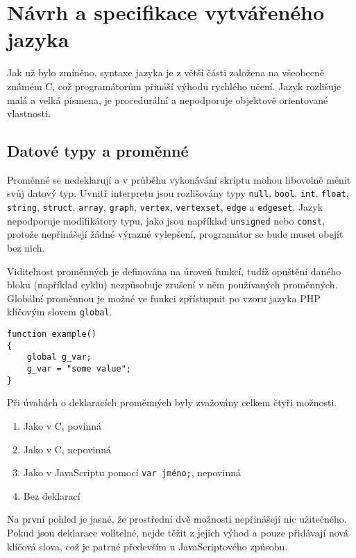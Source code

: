 \documentclass[11pt,twoside,a4paper]{book}
\begin{document}
\section{Návrh a specifikace vytvářeného jazyka}

Jak už bylo zmíněno, syntaxe jazyka je z větší části založena na všeobecně známém C, což programátorům přináší výhodu rychlého učení. Jazyk rozlišuje malá a velká písmena, je procedurální a nepodporuje objektově orientované vlastnosti.


\subsection{Datové typy a proměnné}
\label{datove_typy_a_promenne}

Proměnné se nedeklarují a v průběhu vykonávání skriptu mohou libovolně měnit svůj datový typ. Uvnitř interpretu jsou rozlišovány typy \texttt{null}, \texttt{bool}, \texttt{int}, \texttt{float}, \texttt{string}, \texttt{struct}, \texttt{array}, \texttt{graph}, \texttt{vertex}, \texttt{vertexset}, \texttt{edge} a \texttt{edgeset}. Jazyk nepodporuje modifikátory typu, jako jsou například \texttt{unsigned} nebo \texttt{const}, protože nepřinášejí žádné výrazné vylepšení, programátor se bude muset obejít bez nich.

Viditelnost proměnných je definována na úroveň funkcí, tudíž opuštění daného bloku (například cyklu) nezpůsobuje zrušení v něm používaných proměnných. Globální pro\-měn\-nou je možné ve funkci zpřístupnit po vzoru jazyka PHP klíčovým slovem \texttt{global}.

\begin{verbatim}
function example()
{
    global g_var;
    g_var = "some value";
}
\end{verbatim}

Při úvahách o deklaracích proměnných byly zvažovány celkem čtyři možnosti.

\begin{enumerate}
\item Jako v C, povinná
\item Jako v C, nepovinná
\item Jako v JavaScriptu pomocí \texttt{var jméno;}, nepovinná
\item Bez deklarací
\end{enumerate}

Na první pohled je jasné, že prostřední dvě možnosti nepřinášejí nic užitečného. Pokud jsou deklarace volitelné, nejde těžit z jejich výhod a pouze přidávají nová klíčová slova, což je patrné především u JavaScriptového způsobu.
\end{document}

